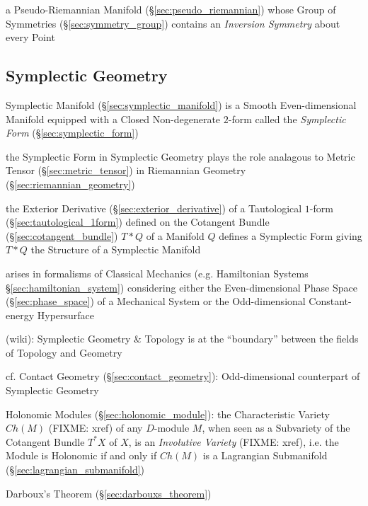 \begin{itemize}
a Pseudo-Riemannian Manifold (\S\ref{sec:pseudo_riemannian}) whose Group of
Symmetries (\S\ref{sec:symmetry_group}) contains an \emph{Inversion Symmetry}
about every Point



\subsection{Symplectic Geometry}\label{sec:symplectic_geometry}

Symplectic Manifold (\S\ref{sec:symplectic_manifold}) is a Smooth
Even-dimensional Manifold equipped with a Closed Non-degenerate $2$-form called
the \emph{Symplectic Form} (\S\ref{sec:symplectic_form})

the Symplectic Form in Symplectic Geometry plays the role analagous to Metric
Tensor (\S\ref{sec:metric_tensor}) in Riemannian Geometry
(\S\ref{sec:riemannian_geometry})

the Exterior Derivative (\S\ref{sec:exterior_derivative}) of a Tautological
$1$-form (\S\ref{sec:tautological_1form}) defined on the Cotangent Bundle
(\S\ref{sec:cotangent_bundle}) $T * Q$ of a Manifold $Q$ defines a Symplectic
Form giving $T * Q$ the Structure of a Symplectic Manifold

arises in formalisms of Classical Mechanics (e.g. Hamiltonian Systems
\S\ref{sec:hamiltonian_system}) considering either the Even-dimensional Phase
Space (\S\ref{sec:phase_space}) of a Mechanical System or the Odd-dimensional
Constant-energy Hypersurface

(wiki): Symplectic Geometry \& Topology is at the ``boundary'' between the
fields of Topology and Geometry

\fist cf. Contact Geometry (\S\ref{sec:contact_geometry}): Odd-dimensional
counterpart of Symplectic Geometry

\fist Holonomic Modules (\S\ref{sec:holonomic_module}): the Characteristic
Variety $Ch(M)$ (FIXME: xref) of any $D$-module $M$, when seen as a Subvariety
of the Cotangent Bundle $T^*X$ of $X$, is an \emph{Involutive Variety} (FIXME:
xref), i.e. the Module is Holonomic if and only if $Ch(M)$ is a Lagrangian
Submanifold (\S\ref{sec:lagrangian_submanifold})

Darboux's Theorem (\S\ref{sec:darbouxs_theorem})




\end{itemize}
